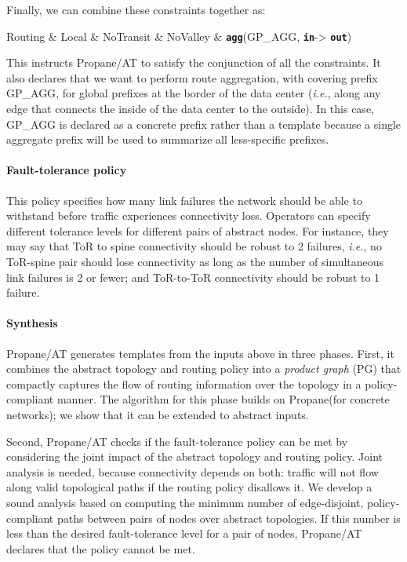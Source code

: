 \documentclass[numbers, 10pt, preprint]{sigplanconf}
\newcommand{\ryan}[1]{\textcolor{green}{[ryan: #1]}}
\newcommand{\IE}{\emph{i.e.}}
\newcommand{\sysname}{{\text{}\small \sf Propane/AT}\xspace}
\newcommand{\Propane}{{\text{}\small \sf Propane}\xspace}
\newcommand{\para}[1]{\paragraph*{\textbf{#1}}}
\newcommand{\KW}[1]{\texttt{\small\bfseries{#1}}}
\newcommand{\Agg}{\KW{agg}}
\newcommand{\In}{\KW{in}}
\newcommand{\Out}{\KW{out}}
\begin{document}
Finally, we can combine these constraints together as:

\begin{code}
Routing & Local & NoTransit &
NoValley & \Agg(GP_AGG, \In -> \Out)
\end{code}
\noindent
This instructs \sysname to satisfy the conjunction of all the constraints. It also declares that we want to perform route aggregation, with covering prefix {\small GP\_AGG}, for global prefixes at the border of the data center (\IE, along any edge that connects the inside of the data center to the outside). In this case, {\small GP\_AGG} is declared as a concrete prefix rather than a template because a single aggregate prefix will be used to summarize all less-specific prefixes.

\para{Fault-tolerance policy} This policy specifies how many link failures the network should be able to withstand before traffic experiences connectivity loss. Operators can specify different tolerance levels for different pairs of abstract nodes. For instance, they may say that ToR to spine connectivity should be robust to 2 failures, \IE, no ToR-spine pair should lose connectivity as long as the number of simultaneous link failures is 2 or fewer; and ToR-to-ToR connectivity should be robust to 1 failure.

\para{Synthesis} \sysname generates templates from the inputs above in three phases. First, it combines the abstract topology and routing policy into a {\em product graph} (PG) that compactly captures the flow of routing information over the topology in a policy-compliant manner. The algorithm for this phase builds on \Propane (for concrete networks); we show that it can be extended to abstract inputs.

Second, \sysname checks if the fault-tolerance policy can be met by considering the joint impact of the abstract topology and routing policy. Joint analysis is needed, because connectivity depends on both: traffic will not flow along valid topological paths if the routing policy disallows it.
%
We develop a sound analysis based on computing the minimum
number of edge-disjoint, policy-compliant paths between pairs of nodes
over abstract topologies. If this number is less
than the desired fault-tolerance level for a pair of nodes, \sysname declares that the
policy cannot be met.
\end{document}
